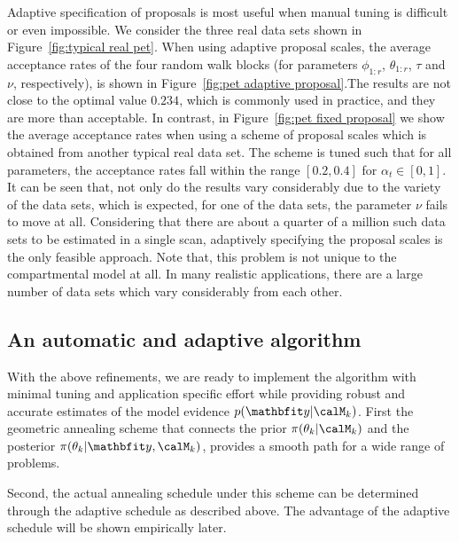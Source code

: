 Adaptive specification of proposals is most useful when manual tuning is difficult or even impossible. We consider the three real \pet data sets shown in Figure~\ref{fig:typical real pet}. When using adaptive proposal scales, the average acceptance rates of the four random walk blocks (for parameters $\phi_{1:r}$, $\theta_{1:r}$, $\tau$ and $\nu$, respectively), is shown in Figure~\ref{fig:pet adaptive proposal}.The results are not close to the optimal value $0.234$, which is commonly used in practice, and they are more than acceptable. In contrast, in Figure~\ref{fig:pet fixed proposal} we show the average acceptance rates when using a scheme of proposal scales which is obtained from another typical real \pet data set. The scheme is tuned such that for all parameters, the acceptance rates fall within the range $[0.2, 0.4]$ for $\alpha_t \in [0, 1]$. It can be seen that, not only do the results vary considerably due to the variety of the data sets, which is expected, for one of the data sets, the parameter $\nu$ fails to move at all. Considering that there are about a quarter of a million such data sets to be estimated in a single \pet scan, adaptively specifying the proposal scales is the only feasible approach. Note that, this problem is not unique to the \pet compartmental model at all. In many realistic applications, there are a large number of data sets which vary considerably from each other.

\subsection{An automatic and adaptive algorithm}
\label{sub:An automatic and adaptive algorithm}

With the above refinements, we are ready to implement the \smc[2] algorithm with minimal tuning and application specific effort while providing robust and accurate estimates of the model evidence $p(\data|\calM_k)$. First the geometric annealing scheme that connects the prior $\pi(\theta_k|\calM_k)$ and the posterior $\pi(\theta_k|\data,\calM_k)$, provides a smooth path for a wide range of problems.

Second, the actual annealing schedule under this scheme can be determined through the adaptive schedule as described above. The advantage of the adaptive schedule will be shown empirically later.

